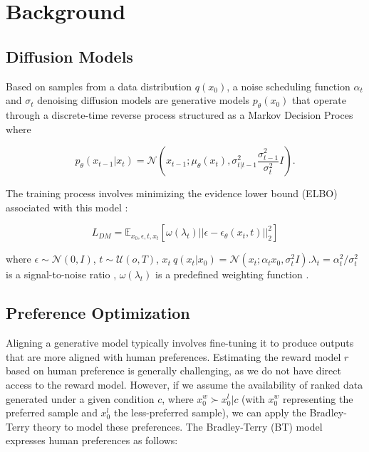 \section{Background}
\label{sec:appendix_background}
\subsection{Diffusion Models}
Based on samples from a data distribution $q(x_0)$, a noise scheduling function $\alpha_t$ and $\sigma_t$ \citep{rombach2022high} denoising diffusion models \citep{song2020score} are generative models $p_\theta(x_0)$  that operate through a discrete-time reverse process structured as a Markov Decision Proces where

\begin{equation}
    p_{\theta}(x_{t-1}|x_t) = \mathcal{N}(x_{t-1}; \mu_\theta(x_t), \sigma^{2}_{t|t-1} \frac{\sigma^{2}_{t-1}}{\sigma^{2}_t}I).
\end{equation}

The training process involves minimizing the evidence lower bound (ELBO) associated with this model \citep{song2021maximum}:

\begin{equation}
    L_{DM} = \mathit{\mathbb{E}}_{x_0,\epsilon,t,x_t}[\omega(\lambda_t)||\epsilon-\epsilon_\theta(x_t,t)||^{2}_2]
\end{equation}


where $\epsilon \sim \mathcal{N}(0,I)$, $t \sim \mathcal{U}(o,T)$, $x_t ~ q(x_t|x_0)= \mathcal{N}(x_t; \alpha_t x_0, \sigma^2_tI).\lambda_t = \alpha^2_t / \sigma^2_t$ is a signal-to-noise ratio \citep{kingma2021variational}, $\omega(\lambda_t)$ is a predefined weighting function \citep{song2019generative}.

\subsection{Preference Optimization}
Aligning a generative model typically involves fine-tuning it to produce outputs that are more aligned with human preferences. Estimating the reward model \( r \) based on human preference is generally challenging, as we do not have direct access to the reward model. However, if we assume the availability of ranked data generated under a given condition \( c \), where \( x_0^w \succ x_0^l | c \) (with \( x_0^w \) representing the preferred sample and \( x_0^l \) the less-preferred sample), we can apply the Bradley-Terry theory to model these preferences. The Bradley-Terry (BT) model expresses human preferences as follows:

